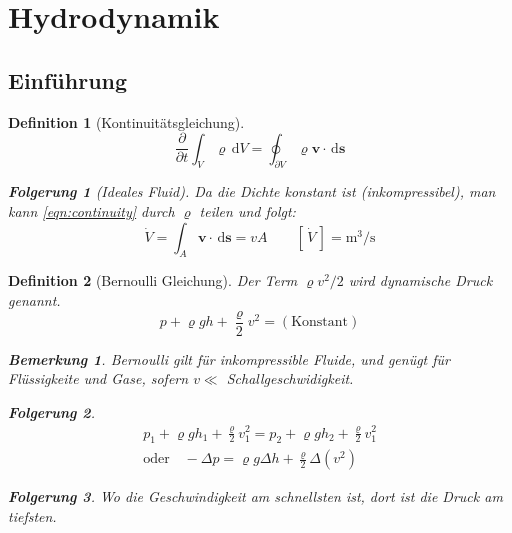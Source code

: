 \documentclass[a4paper, twocolumn]{article}
\numberwithin{equation}{section}
\theoremstyle{hsr-def}
\newtheorem{definition}{Definition}[section]
\theoremstyle{hsr-sub}
\newtheorem{result}{Folgerung}[definition]
\theoremstyle{hsr-unnum}
\newtheorem{remark}{Bemerkung}[definition]
\newcommand{\dd}[1]{\ensuremath{\mathrm{d}#1}}
\newcommand{\di}[1]{\,\dd{#1}}
\newcommand{\pderiv}[2]{\ensuremath{\frac{\partial #1}{\partial #2}}}
\renewcommand{\vec}[1]{\ensuremath{\mathbf{#1}}}
\newcommand{\unitsof}[1]{\ensuremath{\left[\,#1\,\right]}}
\begin{document}
\section{Hydrodynamik}
\subsection{Einf\"uhrung}
\begin{definition}[Kontinuit\"atsgleichung]
\begin{equation} \label{eqn:continuity}
    \pderiv{}{t}\int_V \varrho \di{V} 
    = \oint_{\partial V} \varrho \vec{v}\cdot\di{\vec{s}}
\end{equation}

\begin{result}[Ideales Fluid]
Da die Dichte konstant ist (inkompressibel), man kann \eqref{eqn:continuity} durch \(\varrho\) teilen und folgt:
\[
    \dot{V} = \int_A \vec{v}\cdot\di{\vec{s}} = vA
    \qquad
    \unitsof{\dot{V}} = \si{\cubic\metre\per\second}
\]
\end{result}

\end{definition}

\begin{definition}[Bernoulli Gleichung]
Der Term \(\varrho v^2 / 2\) wird \emph{dynamische Druck} genannt.
\[
    p + \varrho g h + \frac{\varrho}{2} v^2 = (\text{Konstant})
\]

\begin{remark}
Bernoulli gilt f\"ur inkompressible Fluide, und gen\"ugt f\"ur Fl\"ussigkeite und Gase, sofern \(v \ll \) Schallgeschwidigkeit.
\end{remark}

\begin{result}
\begin{gather*}
    p_1 + \varrho g h_1 + \frac{\varrho}{2} v_1^2
    =
    p_2 + \varrho g h_2 + \frac{\varrho}{2} v_1^2
    \\
    \text{oder}\quad -\Delta p = \varrho g \Delta h + \frac{\varrho}{2} \Delta \left( v^2 \right)
\end{gather*}
\end{result}

\begin{result}
Wo die Geschwindigkeit am schnellsten ist, dort ist die Druck am tiefsten.
\end{result}

\end{definition}
\end{document}
